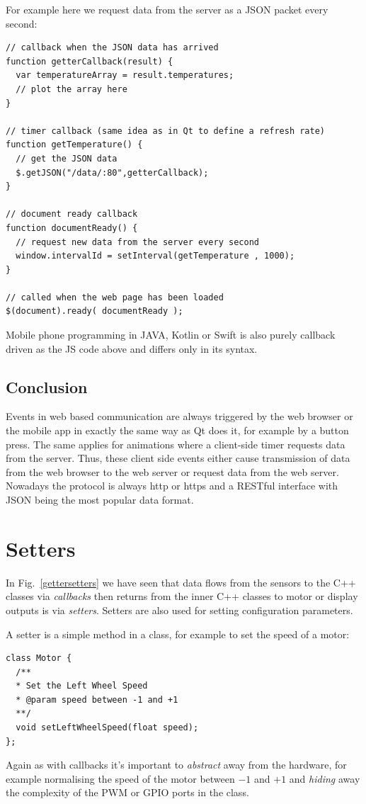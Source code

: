 \documentclass[12pt]{report}
\begin{document}
For example here we request data from the server as a JSON
packet every second:

\begin{verbatim}
// callback when the JSON data has arrived
function getterCallback(result) {
  var temperatureArray = result.temperatures;
  // plot the array here
}

// timer callback (same idea as in Qt to define a refresh rate)
function getTemperature() {
  // get the JSON data
  $.getJSON("/data/:80",getterCallback);
}

// document ready callback
function documentReady() {
  // request new data from the server every second
  window.intervalId = setInterval(getTemperature , 1000);
}

// called when the web page has been loaded
$(document).ready( documentReady );
\end{verbatim}

Mobile phone programming in JAVA, Kotlin or Swift is also purely
callback driven as the JS code above and differs only in its syntax.

\section{Conclusion}
Events in web based communication are always triggered by the web
browser or the mobile app in exactly the same way as Qt does it, for
example by a button press. The same applies for animations where a
client-side timer requests data from the server. Thus, these client
side events either cause transmission of data from the web browser to
the web server or request data from the web server. Nowadays the protocol is
always http or https and a RESTful interface with JSON
being the most popular data format.


\chapter{Setters\label{setters}}
In Fig.~\ref{gettersetters} we have seen that data flows from
the sensors to the C++ classes via \textsl{callbacks} then returns
from the inner C++ classes to motor or display outputs is via
\textsl{setters}. Setters are also used for setting configuration
parameters.

A setter is a simple method in a class, for example to set the
speed of a motor:
\begin{verbatim}
class Motor {
  /**
  * Set the Left Wheel Speed
  * @param speed between -1 and +1
  **/
  void setLeftWheelSpeed(float speed);
};
\end{verbatim}
Again as with callbacks it's important to \textsl{abstract} away from the
hardware, for example normalising the speed of the
motor between $-1$ and $+1$ and \textsl{hiding} away the complexity of the
PWM or GPIO ports in the class.
\end{document}
